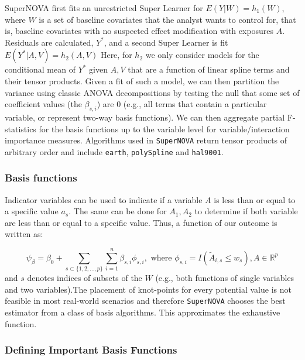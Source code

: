 \documentclass[
]{article}
\begin{document}
SuperNOVA first fits an unrestricted Super Learner for
\(E(Y|W) = h_1(W)\), where \(W\) is a set of baseline covariates that
the analyst wants to control for, that is, baseline covariates with no
suspected effect modification with exposures \(A\). Residuals are
calculated, \(Y^*\), and a second Super Learner is fit
\(E(Y^*|A,V) = h_2(A,V)\) Here, for \(h_2\) we only consider models for
the conditional mean of \(Y^*\) given \(A,V\) that are a function of
linear spline terms and their tensor products. Given a fit of such a
model, we can then partition the variance using classic ANOVA
decompositions by testing the null that some set of coefficient values
(the \(\beta_{s,i}\)) are 0 (e.g., all terms that contain a particular
variable, or represent two-way basis functions). We can then aggregate
partial F-statistics for the basis functions up to the variable level
for variable/interaction importance measures. Algorithms used in
\texttt{SuperNOVA} return tensor products of arbitrary order and include
\texttt{earth}, \texttt{polySpline} and \texttt{hal9001}.

\hypertarget{basis-functions}{%
\subsubsection{Basis functions}\label{basis-functions}}

Indicator variables can be used to indicate if a variable \(A\) is less
than or equal to a specific value \(a_s\). The same can be done for
\(A_1, A_2\) to determine if both variable are less than or equal to a
specific value. Thus, a function of our outcome is written as:

\[\psi_{\beta} = \beta_0 + \sum_{s\subset \{1,2,...,p\}}\sum_{i=1}^{n} \beta_{s,i} \phi_{s,i},
    \text{ where } \phi_{s,i} = I(\tilde{A}_{i,s} \leq w_s), A \in \mathbb{R}^p\]
and \(s\) denotes indices of subsets of the \(W\) (e.g., both functions
of single variables and two variables).The placement of knot-points for
every potential value is not feasible in most real-world scenarios and
therefore \texttt{SuperNOVA} chooses the best estimator from a class of
basis algorithms. This approximates the exhaustive function.

\hypertarget{defining-important-basis-functions}{%
\subsubsection{Defining Important Basis
Functions}\label{defining-important-basis-functions}}
\end{document}
